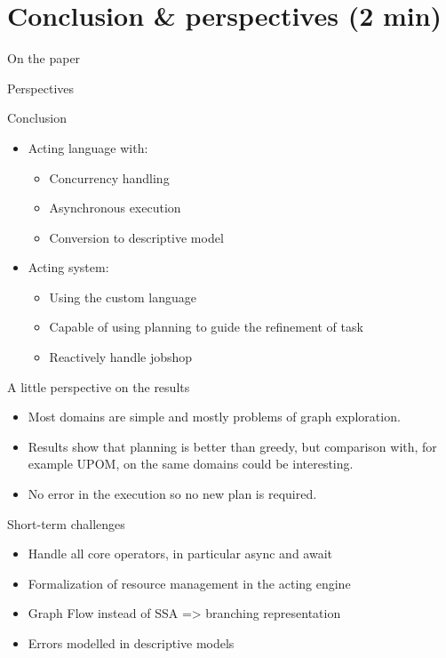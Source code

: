 \section{Conclusion \& perspectives (2 min)}
\begin{frame}{On the paper}
    
\end{frame}
\begin{frame}{Perspectives}
    
\end{frame}

\begin{frame}{Conclusion}
    \begin{itemize}
        \item Acting language with:
        \begin{itemize}
            \item Concurrency handling
            \item Asynchronous execution
            \item Conversion to descriptive model
        \end{itemize}
        \pause
        \item Acting system:
        \begin{itemize}
            \item Using the custom language
            \item Capable of using planning to guide the refinement of task
            \item Reactively handle jobshop
        \end{itemize}
    \end{itemize}
\end{frame}
    
\begin{frame}{A little perspective on the results}
\begin{itemize}
    \item Most domains are simple and mostly problems of graph exploration.
    \pause
    \item Results show that planning is better than greedy, but comparison with, for example UPOM,  on the same domains could be interesting.
    \pause
    \item No error in the execution so no new plan is required.
\end{itemize}
\end{frame}

\begin{frame}{Short-term challenges}
    \begin{itemize}
        \item Handle all core operators, in particular async and await
        \pause
        \item Formalization of resource management in the acting engine
        \pause
        \item Graph Flow instead of SSA => branching representation
        \pause
        \item Errors modelled in descriptive models
    \end{itemize}
\end{frame}


